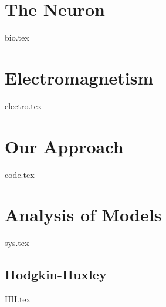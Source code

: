
\chapter{The Neuron}\label{ch:neuron}
{bio.tex}

\chapter{Electromagnetism}\label{ch:elemag}
{electro.tex}

\chapter{Our Approach}\label{ch:approa}
{code.tex}

\chapter{Analysis of Models}\label{ch:matmod}
{sys.tex}

\newpage
\section{Hodgkin-Huxley}
{HH.tex}







